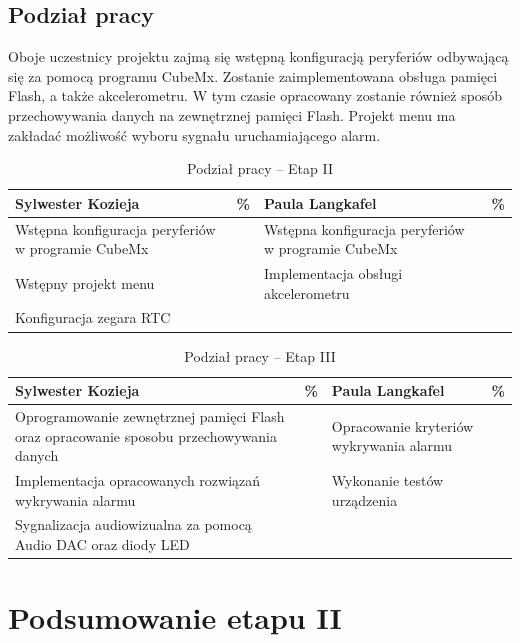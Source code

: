 \documentclass[10pt, a4paper]{article}
\begin{document}

\subsection{Podział pracy}
Oboje uczestnicy projektu zajmą się wstępną konfiguracją peryferiów odbywającą się za pomocą programu CubeMx. Zostanie zaimplementowana obsługa pamięci Flash, a także akcelerometru. W tym czasie opracowany zostanie również sposób przechowywania danych na zewnętrznej pamięci Flash. Projekt menu ma zakładać możliwość wyboru sygnału uruchamiającego alarm.

\begin{table}[H]
	\centering
	\begin{tabular}{|L{7cm}|L{0.8cm}||L{7cm}|L{0.8cm}|}
		\hline
		\hline
		\textbf{Sylwester Kozieja} & 
		\% & 
		\textbf{Paula Langkafel} & \%\\
		\hline
		\hline
		Wstępna konfiguracja peryferiów w programie CubeMx		& &	
		Wstępna konfiguracja peryferiów w programie CubeMx & \\
		\hline
		Wstępny projekt menu& &
		Implementacja obsługi akcelerometru &\\
		
		\hline Konfiguracja zegara RTC & & &\\
		\hline
	\end{tabular}
	\caption{Podział pracy -- Etap II}
	\label{tab:PodzialPracyEtap2}
\end{table}

\begin{table}[H]
	\centering
	\begin{tabular}{|L{7cm}|L{0.8cm}||L{7cm}|L{0.8cm}|}
		\hline
		\hline
		\textbf{Sylwester Kozieja} & 
		\% & 
		\textbf{Paula Langkafel} & \%\\
		\hline
		\hline
		Oprogramowanie zewnętrznej pamięci Flash oraz opracowanie sposobu przechowywania danych		& &	
		Opracowanie kryteriów wykrywania alarmu &\\
		\hline
		Implementacja opracowanych rozwiązań wykrywania alarmu  & &
		Wykonanie testów urządzenia &\\
		\hline
		Sygnalizacja audiowizualna za pomocą Audio DAC oraz diody LED & & &\\
		\hline
	\end{tabular}
	\caption{Podział pracy -- Etap III}
	\label{tab:PodzialPracyEtap3}
\end{table}

\section{Podsumowanie etapu II}
\end{document}
